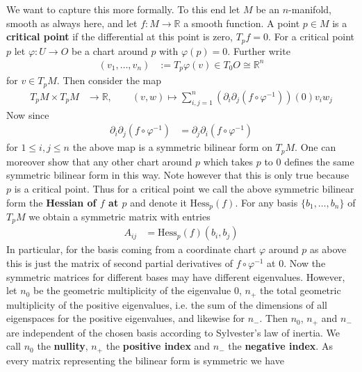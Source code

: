 \\\\
We want to capture this more formally. To this end let $M$ be an $n$-manifold, smooth as always here, and let $f \colon M \to \mathbb{R}$ a smooth function. A point $p \in M$ is a \textbf{critical point} if the differential at this point is zero, $T_{p}f = 0$. For a critical point $p$ let $\varphi \colon U \to O$ be a chart around $p$ with $\varphi(p) = 0$. Further write
\begin{align*}
  (v_{1},\ldots,v_{n})
  &:=
  T_{p}\varphi(v)
  \in
  T_{0}O
  \cong
  \mathbb{R}^{n}
\end{align*}
for $v \in T_{p}M$. Then consider the map
\begin{align*}
  T_{p}M
  \times
  T_{p}M
  &\to
  \mathbb{R}
  ,\qquad
  (v,w)
  \mapsto
  \sum_{i,j=1}^{n}
  \left(
    \partial_{i}
    \partial_{j}
    (f \circ \varphi^{-1})
  \right)
  (0)
  v_{i}
  w_{j}
\end{align*}
Now since
\begin{align*}
  \partial_{i}
  \partial_{j}
  (f \circ \varphi^{-1})
  &=
  \partial_{j}
  \partial_{i}
  (f \circ \varphi^{-1})
\end{align*}
for $1 \leq i,j \leq n$ the above map is a symmetric bilinear form on $T_{p}M$. One can moreover show that any other chart around $p$ which takes $p$ to $0$ defines the same symmetric bilinear form in this way. Note however that this is only true because $p$ is a critical point. Thus for a critical point we call the above symmetric bilinear form the \textbf{Hessian of $f$ at $p$} and denote it $\mathrm{Hess}_{p}(f)$. For any basis $\lbrace b_{1},\ldots,b_{n} \rbrace$ of $T_{p}M$ we obtain a symmetric matrix with entries
\begin{align*}
  A_{ij}
  &=
  \mathrm{Hess}_{p}(f)
  (b_{i},b_{j})
\end{align*}
In particular, for the basis coming from a coordinate chart $\varphi$ around $p$ as above this is just the matrix of second partial derivatives of $f \circ \varphi^{-1}$ at $0$. Now the symmetric matrices for different bases may have different eigenvalues. However, let $n_{0}$ be the geometric multiplicity of the eigenvalue $0$, $n_{+}$ the total geometric multiplicity of the positive eigenvalues, i.e. the sum of the dimensions of all eigenspaces for the positive eigenvalues, and likewise for $n_{-}$. Then $n_{0}$, $n_{+}$ and $n_{-}$ are independent of the chosen basis according to Sylvester's law of inertia. We call $n_{0}$ the \textbf{nullity}, $n_{+}$ the \textbf{positive index} and $n_{-}$ the \textbf{negative index}. As every matrix representing the bilinear form is symmetric we have
